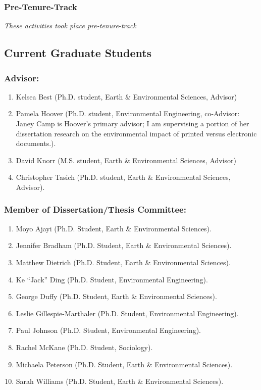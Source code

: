 \documentclass[10pt]{article}
\begin{document}
    \subsubsection{Pre-Tenure-Track}
    \emph{These activities took place pre-tenure-track}
    \begin{enumerate}
        
    \end{enumerate}
	\subsection{Current Graduate Students}
    \subsubsection{Advisor:}
	\begin{enumerate}
    \item Kelsea Best (Ph.D. student, Earth \& Environmental Sciences, Advisor)
    \item Pamela Hoover (Ph.D. student, Environmental Engineering, co-Advisor: Janey Camp is Hoover's primary advisor; I am supervising a portion of her dissertation research on the environmental impact of printed versus electronic documents.).
    \item David Knorr (M.S. student, Earth \& Environmental Sciences, Advisor)
    \item Christopher Tasich (Ph.D. student, Earth \& Environmental Sciences, Advisor).
    \end{enumerate}
    \subsubsection{Member of Dissertation/Thesis Committee:}
    \begin{enumerate}
    \item Moyo Ajayi (Ph.D. Student, Earth \& Environmental Sciences).
    \item Jennifer Bradham (Ph.D. Student, Earth \& Environmental Sciences).
    \item Matthew Dietrich (Ph.D. Student, Earth \& Environmental Sciences).
    \item Ke ``Jack'' Ding (Ph.D. Student, Environmental Engineering).
    \item George Duffy (Ph.D. Student, Earth \& Environmental Sciences).
    \item Leslie Gillespie-Marthaler (Ph.D. Student, Environmental Engineering).
    \item Paul Johnson (Ph.D. Student, Environmental Engineering).
    \item Rachel McKane (Ph.D. Student, Sociology).
    \item Michaela Peterson (Ph.D. Student, Earth \& Environmental Sciences).
    \item Sarah Williams (Ph.D. Student, Earth \& Environmental Sciences).
    \end{enumerate}
\end{document}
